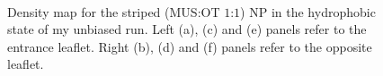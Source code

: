 \begin{figure}[p]
{		}\\%
	\caption{Density map for the striped (\acs{MUS}:\acs{OT} $1$:$1$) \acs{NP} in the hydrophobic state of my unbiased run. Left (a), (c) and (e) panels refer to the entrance leaflet. Right (b), (d) and (f) panels refer to the opposite leaflet.}%
	\label{fig:stripedDensity}
\end{figure}

